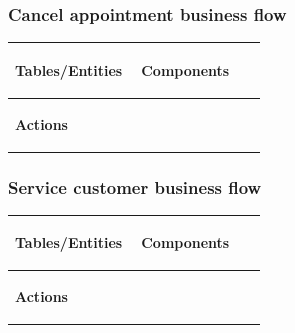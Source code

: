 \documentclass[]{VUMIFTemplateClass}
\newenvironment{mpitemlist}[1][\linewidth]{%
    \begin{minipage}[t]{#1}%
        \setlength{\leftmargini}{12pt}%
        \begin{itemize}%
            \setlength{\itemsep}{1pt}%
            \setlength{\parskip}{0pt}%
            \setlength{\parsep}{0pt}%
}{%
        \end{itemize}%
    \end{minipage}\newline
}
\begin{document}
\subsubsection{Cancel appointment business flow}


\begin{center}
\setlength{\tabcolsep}{8pt}
\begin{tabular}{|p{0.48\linewidth}|p{0.48\linewidth}|}
\hline
\textbf{Tables/Entities} \newline
\begin{mpitemlist}

\end{mpitemlist}
&
\textbf{Components} \newline
\begin{mpitemlist}

\end{mpitemlist}
\\ \hline
\textbf{Actions} \newline
\begin{mpitemlist}

\end{mpitemlist}
&

\\ \hline
\end{tabular}
\end{center}




\subsubsection{Service customer business flow}


\begin{center}
\setlength{\tabcolsep}{8pt}
\begin{tabular}{|p{0.48\linewidth}|p{0.48\linewidth}|}
\hline
\textbf{Tables/Entities} \newline
\begin{mpitemlist}

\end{mpitemlist}
&
\textbf{Components} \newline
\begin{mpitemlist}

\end{mpitemlist}
\\ \hline
\textbf{Actions} \newline
\begin{mpitemlist}

\end{mpitemlist}
&

\\ \hline
\end{tabular}
\end{center}
\end{document}
